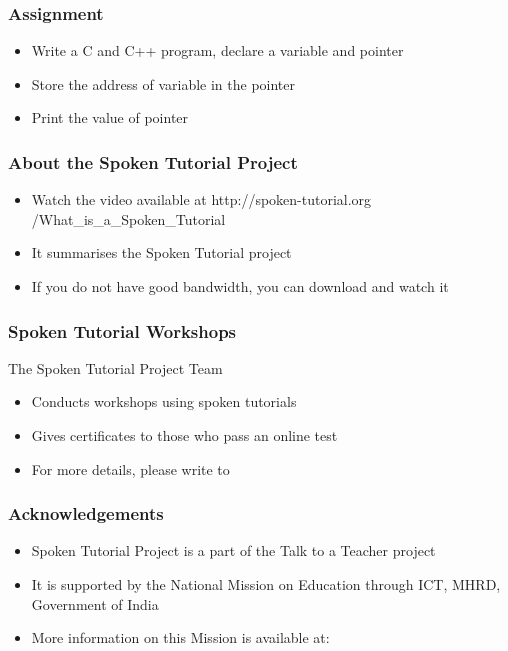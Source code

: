 \documentclass[17pt]{beamer}
\begin{document}
\begin{frame} 
\frametitle{Assignment}
\begin{itemize}
\item Write a C and C++ program, declare a variable and pointer
\item Store the address of variable in the pointer
\item Print the value of pointer
\end{itemize}
\end{frame}


\begin{frame}
\frametitle{About the Spoken Tutorial Project}
\begin{itemize}
\item Watch the video available at {\color{blue} http://spoken-tutorial.org /What\_is\_a\_Spoken\_Tutorial} 
\item It summarises the Spoken Tutorial project 
\item If you do not have good bandwidth, you can download and watch it
\end{itemize}
\end{frame}

\begin{frame}
\frametitle{Spoken Tutorial Workshops}The Spoken Tutorial Project Team 
\begin{itemize}
\item Conducts workshops using spoken tutorials 
\item Gives certificates to those who pass an online test 
\item For more details, please write to \\ 
\end{itemize}
\end{frame}

\begin{frame}
\frametitle{Acknowledgements}
\begin{itemize}
\item Spoken Tutorial Project is a part of the Talk to a Teacher  project 
\item It is supported by the National Mission on Education through  ICT, MHRD, Government of India 
\item More information on this Mission is available at: \\ 
\end{itemize}
\end{frame}
\end{document}
